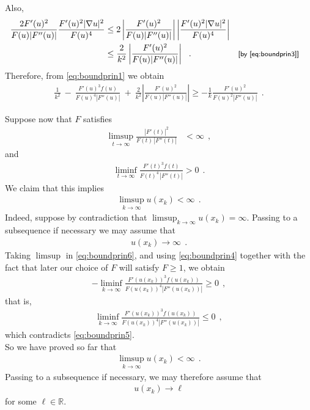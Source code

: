 \documentclass[a4paper,11pt,openright,twoside]{book}
\newcommand{\R}{\mathbb{R}}
\newcommand{\1}{\mathds{1}}
\newcommand{\commb}[1]{\textsf{{\footnotesize[#1]}}}
\theoremstyle{plain}
\theoremstyle{definition}
\theoremstyle{remark}
\begin{document}
Also,
\begin{align*}
	\frac{2F'(u)^2}{F(u)|F''(u)|} \frac{F'(u)^2|\nabla u|^2}{F(u)^4}
	&\leq
	2 \left| \frac{F'(u)^2}{F(u)|F''(u)|} \right|
	\left| \frac{F'(u)^2 |\nabla u|^2}{F(u)^4} \right|\\
	&\leq
	\frac{2}{k^2}\left| \frac{F'(u)^2}{F(u)|F''(u)|} \right|
	\ \ . && \commb{by \eqref{eq:boundprin3}}
\end{align*}
Therefore, from \eqref{eq:boundprin1} we obtain
\begin{align}\label{eq:boundprin6}
	\frac{1}{k^2}
	\ -\ 
	\frac{F'(u)^3 f(u)}{F(u)^4 |F''(u)|}
	\ +\ \frac{2}{k^2} \left| \frac{F'(u)^2}{F(u)|F''(u)|} \right|
	\geq
	-\frac{1}{k}\frac{F'(u)^2}{F(u)^2|F''(u)|}
	\ \ .
\end{align}

Suppose now that $F$ satisfies
\begin{align}\label{eq:boundprin4}
	\limsup_{t\to\infty}\frac{|F'(t)|^2}{F(t)\,|F''(t)|} &< \infty
	\ \ ,
\end{align}
and
\begin{align}\label{eq:boundprin5}
	\liminf_{t\to\infty}\frac{F'(t)^3 f(t)}{F(t)^4\,|F''(t)|}>0
	\ \ .
\end{align}
We claim that this implies
\begin{align*}
	\limsup_{k\to\infty} u(x_k) < \infty
	\ \ .
\end{align*}
Indeed, suppose by contradiction that $\limsup_{k\to\infty} u(x_k)=\infty$. Passing to a subsequence if necessary we may assume that
\begin{align*}
	u(x_k)\to \infty
	\ \ .
\end{align*}
Taking $\limsup$ in \eqref{eq:boundprin6}, and using \eqref{eq:boundprin4} together with the fact that later our choice of $F$ will satisfy $F\geq 1$, we obtain
\begin{align*}
	-\liminf_{k\to\infty}
	\frac{F'(u(x_k))^3 f(u(x_k))}{F(u(x_k))^4 |F''(u(x_k))|}
	\geq 0
	\ \ ,
\end{align*}
that is,
\begin{align*}
	\liminf_{k\to\infty}
	\frac{F'(u(x_k))^3 f(u(x_k))}{F(u(x_k))^4 |F''(u(x_k))|}
	\leq 0
	\ \ ,
\end{align*}
which contradicts \eqref{eq:boundprin5}.\\

So we have proved so far that
\begin{align*}
	\limsup_{k\to\infty} u(x_k) < \infty
	\ \ .
\end{align*}
Passing to a subsequence if necessary, we may therefore assume that
\begin{align*}
	u(x_k)\to \ell
\end{align*}
for some $\ell\in\R$.\\
\end{document}
